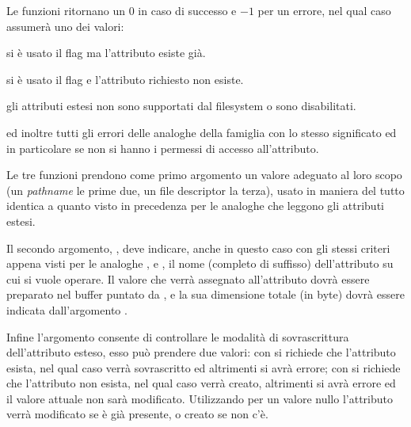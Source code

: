 \begin{funcproto}{
}

{Le funzioni ritornano un $0$ in caso di successo e $-1$ per un errore, nel qual
  caso  assumerà uno dei valori:
  \begin{errlist}
  \item[\errcode{EEXIST}] si è usato il flag  ma
    l'attributo esiste già.
  \item[\errcode{ENOATTR}] si è usato il flag  e
    l'attributo richiesto non esiste.
  \item[\errcode{ENOTSUP}] gli attributi estesi non sono supportati dal
    filesystem o sono disabilitati.
  \end{errlist}
  ed inoltre tutti gli errori delle analoghe della famiglia  con lo
  stesso significato ed in particolare  se non si hanno i
  permessi di accesso all'attributo.}
\end{funcproto}

Le tre funzioni prendono come primo argomento un valore adeguato al loro scopo
(un \textit{pathname} le prime due, un file descriptor la terza), usato in
maniera del tutto identica a quanto visto in precedenza per le analoghe che
leggono gli attributi estesi.

Il secondo argomento, , deve indicare, anche in questo caso con
gli stessi criteri appena visti per le analoghe ,
 e , il nome (completo di suffisso)
dell'attributo su cui si vuole operare.  Il valore che verrà assegnato
all'attributo dovrà essere preparato nel buffer puntato da , e la
sua dimensione totale (in byte) dovrà essere indicata dall'argomento
.

Infine l'argomento  consente di controllare le modalità di
sovrascrittura dell'attributo esteso, esso può prendere due valori: con
 si richiede che l'attributo esista, nel qual caso
verrà sovrascritto ed altrimenti si avrà errore; con  si
richiede che l'attributo non esista, nel qual caso verrà creato, altrimenti si
avrà errore ed il valore attuale non sarà modificato.  Utilizzando per
 un valore nullo l'attributo verrà modificato se è già presente, o
creato se non c'è.

